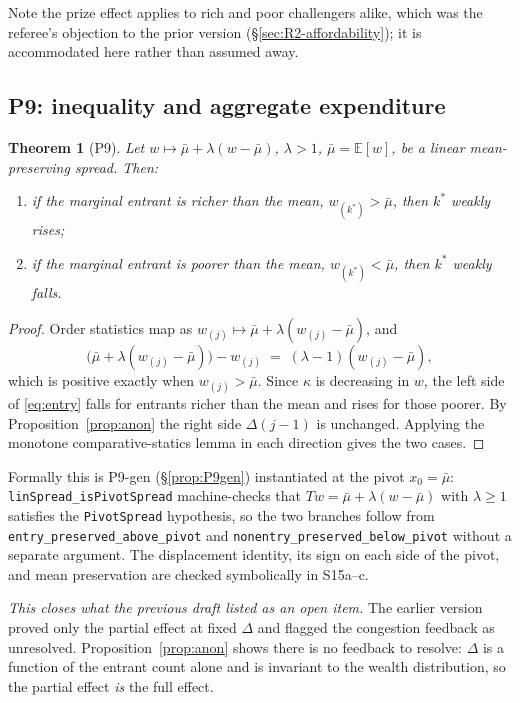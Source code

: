 \documentclass[11pt]{article}
\newtheorem{theorem}{Theorem}
\begin{document}
Note the prize effect applies to rich and poor challengers alike, which
was the referee's objection to the prior version
(\S\ref{sec:R2-affordability}); it is accommodated here rather than
assumed away.

\subsection{P9: inequality and aggregate expenditure}
\label{prop:P9}

\begin{theorem}[P9]
\label{thm:P9}
Let $w\mapsto\bar\mu+\lambda(w-\bar\mu)$, $\lambda>1$,
$\bar\mu=\mathbb E[w]$, be a linear mean-preserving spread. Then:
\begin{enumerate}
\item if the marginal entrant is richer than the mean,
  $w_{(k^*)}>\bar\mu$, then $k^*$ weakly \emph{rises};
\item if the marginal entrant is poorer than the mean,
  $w_{(k^*)}<\bar\mu$, then $k^*$ weakly \emph{falls}.
\end{enumerate}
\end{theorem}
\begin{proof}
Order statistics map as $w_{(j)}\mapsto\bar\mu+\lambda(w_{(j)}-\bar\mu)$,
and
\[
  \big(\bar\mu+\lambda(w_{(j)}-\bar\mu)\big)-w_{(j)}
  \;=\;(\lambda-1)(w_{(j)}-\bar\mu),
\]
which is positive exactly when $w_{(j)}>\bar\mu$. Since $\kappa$ is
decreasing in $w$, the left side of \eqref{eq:entry} falls for entrants
richer than the mean and rises for those poorer. By
Proposition~\ref{prop:anon} the right side $\Delta(j-1)$ is unchanged.
Applying the monotone comparative-statics lemma in each direction gives
the two cases.
\end{proof}

Formally this is P9-gen (\S\ref{prop:P9gen}) instantiated at the pivot
$x_0=\bar\mu$: \texttt{linSpread\_isPivotSpread} machine-checks that
$T w=\bar\mu+\lambda(w-\bar\mu)$ with $\lambda\ge1$ satisfies the
\texttt{PivotSpread} hypothesis, so the two branches follow from
\texttt{entry\_preserved\_above\_pivot} and
\texttt{nonentry\_preserved\_below\_pivot} without a separate argument. The
displacement identity, its sign on each side of the pivot, and mean
preservation are checked symbolically in S15a--c.

\emph{This closes what the previous draft listed as an open item.} The
earlier version proved only the partial effect at fixed $\Delta$ and
flagged the congestion feedback as unresolved. Proposition~\ref{prop:anon}
shows there is no feedback to resolve: $\Delta$ is a function of the
entrant count alone and is invariant to the wealth distribution, so the
partial effect \emph{is} the full effect.
\end{document}
